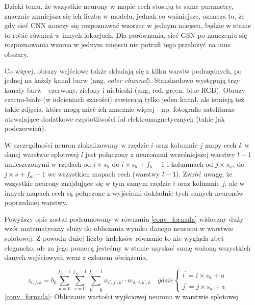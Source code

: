 \documentclass{article}
\begin{document}
Dzięki temu, że wszystkie neurony w mapie cech stosują te same parametry, znacznie zmniejsza się ich liczba w modelu, jednak co ważniejsze, oznacza to, że gdy sieć CNN nauczy się rozpoznawać wzorzec w jednym miejscu, będzie w stanie to robić również w innych lokacjach. Dla porównania, sieć GSN po nauczeniu się rozpoznawania wzorca w jednym miejscu nie potrafi tego przełożyć na inne obszary. \cite{geron}

Co więcej, obrazy wejściowe także składają się z kilku warstw podrzędnych, po jednej na każdy kanał barw (ang. \textit{color channel}). Standardowo występują trzy kanały barw - czerwony, zielony i niebieski (ang, red, green, blue-RGB). Obrazy czarno-białe (w odcieniach szarości) zawierają tylko jeden kanał, ale istnieją też takie zdjęcia, które mogą mieć ich znacznie więcej - np. fotografie satelitarne utrwalające dodatkowe częstotliwości fal elektromagnetycznych (takie jak podczerwień). \cite{geron}

W szczególności neuron zlokalizowany w rzędzie $i$ oraz kolumnie $j$ mapy cech $k$ w danej warstwie splotowej $l$ jest połączony z neuronami wcześniejszej warstwy $l-1$ umieszczonymi w rzędach od $i \times s_{h}$ do $i \times s_{h}+f_{h}-1$ i kolumnach od $j \times s_{w}$, do $j \times s+f_{w}-1$ we wszystkich mapach cech (warstwy $l-1$). Zwróć uwagę, że wszystkie neurony znajdujące się w tym samym rzędzie $i$ oraz kolumnie $j$, ale w innych mapach cech są połączone z wyjściami dokładnie tych samych neuronów poprzedniej warstwy. \cite{geron}

Powyższy opis został podsumowany w równaniu \ref{conv_formula} widoczny duży wzór matematyczny służy do obliczania wyniku danego neuronu w warstwie splotowej. Z powodu dużej liczby indeksów równanie to nie wygląda zbyt elegancko, ale za jego pomocą jesteśmy w stanie uzyskać sumę ważoną wszystkich danych wejściowych wraz z członem obciążenia, \cite{geron}

\begin{center}
	\begin{equation}	
		z_{i,j,k}=b_{k}
		\sum_{u=0}^{f_{h}-1}\sum_{v=0}^{f_{w}-1}\sum_{k^\prime=0}^{f_{n^\prime}-1}
		x_{i\prime,j\prime,k\prime}\cdot w_{u,v,k\prime,k}
		\quad gdzie \left\{ \begin{array}{ll}
			i^\prime = i \times s_{h}+u\\
			j^\prime = j\times s_{w}+v
		\end{array} \right.
		\label{conv_formula}
	\end{equation}
	\ref{conv_formula}: Obliczanie wartości wyjściowej neuronu w warstwie splotowej
\end{center}
\end{document}
